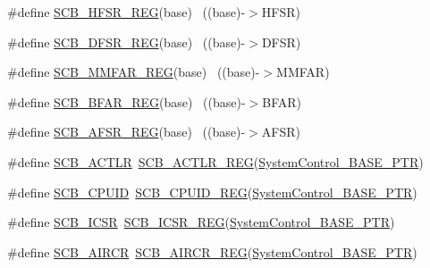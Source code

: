 \begin{DoxyCompactItemize}
\#define \hyperlink{group___s_c_b___register___accessor___macros_ga82f9f02807dd20f1f97226fcbeb5771e}{S\+C\+B\+\_\+\+H\+F\+S\+R\+\_\+\+R\+EG}(base)                                          ~((base)-\/$>$H\+F\+SR)
\item 
\#define \hyperlink{group___s_c_b___register___accessor___macros_ga2ac45bf07176acb69b71189cddba46dc}{S\+C\+B\+\_\+\+D\+F\+S\+R\+\_\+\+R\+EG}(base)                                          ~((base)-\/$>$D\+F\+SR)
\item 
\#define \hyperlink{group___s_c_b___register___accessor___macros_gafbf4831267e040e9b4710ae9fb63c2c9}{S\+C\+B\+\_\+\+M\+M\+F\+A\+R\+\_\+\+R\+EG}(base)                                        ~((base)-\/$>$M\+M\+F\+AR)
\item 
\#define \hyperlink{group___s_c_b___register___accessor___macros_ga9932d2c86e9f7cd72b4fbca18863e757}{S\+C\+B\+\_\+\+B\+F\+A\+R\+\_\+\+R\+EG}(base)                                          ~((base)-\/$>$B\+F\+AR)
\item 
\#define \hyperlink{group___s_c_b___register___accessor___macros_ga9835a953f824d051f48ab361ba7ec70c}{S\+C\+B\+\_\+\+A\+F\+S\+R\+\_\+\+R\+EG}(base)                                          ~((base)-\/$>$A\+F\+SR)
\item 
\#define \hyperlink{group___s_c_b___register___accessor___macros_ga2a94c61032c2b326d148f402585f66f4}{S\+C\+B\+\_\+\+A\+C\+T\+LR}~\hyperlink{group___s_c_b___register___accessor___macros_gacc7b0065f69b9a0d772af30505d9d5e8}{S\+C\+B\+\_\+\+A\+C\+T\+L\+R\+\_\+\+R\+EG}(\hyperlink{group___s_c_b___peripheral_gaf22864785770f832103e904244e078cb}{System\+Control\+\_\+\+B\+A\+S\+E\+\_\+\+P\+TR})
\item 
\#define \hyperlink{group___s_c_b___register___accessor___macros_gad6f841a4188701c78b4fbefc4dcd1cb6}{S\+C\+B\+\_\+\+C\+P\+U\+ID}~\hyperlink{group___s_c_b___register___accessor___macros_ga0fafcf57528f45b4ef5f3c5bfa627d55}{S\+C\+B\+\_\+\+C\+P\+U\+I\+D\+\_\+\+R\+EG}(\hyperlink{group___s_c_b___peripheral_gaf22864785770f832103e904244e078cb}{System\+Control\+\_\+\+B\+A\+S\+E\+\_\+\+P\+TR})
\item 
\#define \hyperlink{group___s_c_b___register___accessor___macros_ga7f8564488243827944de74c4db24b732}{S\+C\+B\+\_\+\+I\+C\+SR}~\hyperlink{group___s_c_b___register___accessor___macros_ga32d507fb0a9ba80ad95e451fc93c942a}{S\+C\+B\+\_\+\+I\+C\+S\+R\+\_\+\+R\+EG}(\hyperlink{group___s_c_b___peripheral_gaf22864785770f832103e904244e078cb}{System\+Control\+\_\+\+B\+A\+S\+E\+\_\+\+P\+TR})
\item 
\#define \hyperlink{group___s_c_b___register___accessor___macros_gafb55c4d149b907fe569a1d8bb31cade1}{S\+C\+B\+\_\+\+A\+I\+R\+CR}~\hyperlink{group___s_c_b___register___accessor___macros_ga0510b76b89d5729f2ba9341356553f3e}{S\+C\+B\+\_\+\+A\+I\+R\+C\+R\+\_\+\+R\+EG}(\hyperlink{group___s_c_b___peripheral_gaf22864785770f832103e904244e078cb}{System\+Control\+\_\+\+B\+A\+S\+E\+\_\+\+P\+TR})

\end{DoxyCompactItemize}

